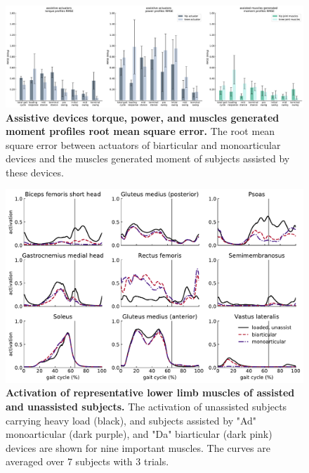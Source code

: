 \documentclass[10pt,letterpaper]{article}
\begin{document}
\begin{figure}[ht]   
	\centering
	\includegraphics[width=\linewidth]{Case_Studies/LoadedMono04_LoadedBi16/RMSE.pdf}
	\vspace{1mm}
	\caption{\small{\textbf{Assistive devices torque, power, and muscles generated moment profiles root mean square error. } The root mean square error between actuators of biarticular and monoarticular devices and the muscles generated moment of subjects assisted by these devices.}}
	\label{Fig_Case01_RMSE}
\end{figure}
\begin{figure}[ht]   
	\centering
	\includegraphics[width=\linewidth]{Case_Studies/LoadedMono04_LoadedBi16/MonoarticularVSBiarticular_Loaded_MusclesActivation.pdf}
	\vspace{1mm}
	\caption{\small{\textbf{Activation of representative lower limb muscles of assisted and unassisted subjects.} The activation of unassisted subjects carrying heavy load (black), and subjects assisted by "Ad" monoarticular (dark purple), and "Da" biarticular (dark pink) devices are shown for nine important muscles. The curves are averaged over 7 subjects with 3 trials.}}
	\label{Fig_Case01_MusclesActivity}
\end{figure}
\end{document}
